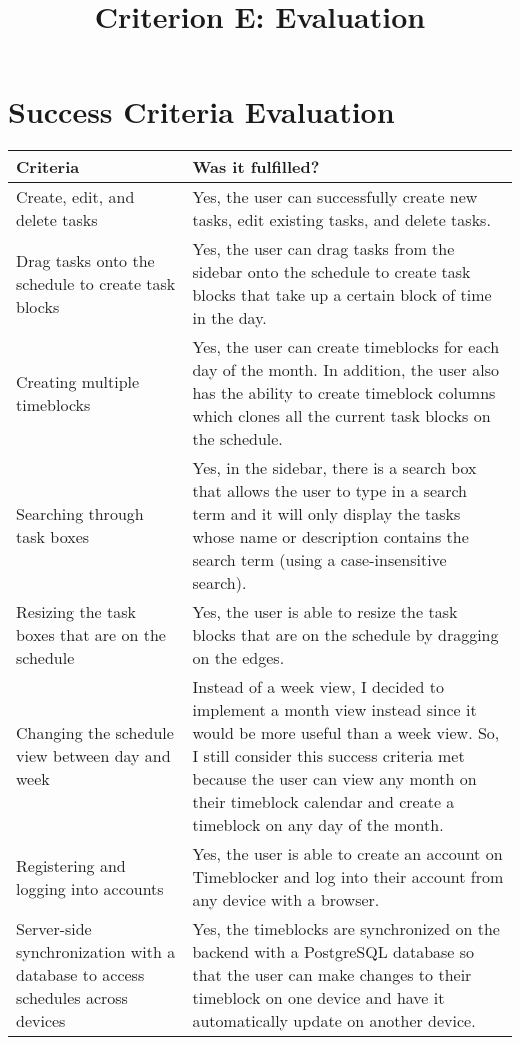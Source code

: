 \documentclass[12pt]{report}
\title{Criterion E: Evaluation}
\begin{document}
\centerline{\textcolor{msblue}{
		\textbf{\fontsize{13}{13}\MyTitle}
	}}


\section*{Success Criteria Evaluation}

\def\arraystretch{1.5}
\begin{xltabular}{\textwidth}{|X|X|}
	\hline
	\textbf{Criteria}
	&
	\textbf{Was it fulfilled?}
	\\\hline
	Create, edit, and delete tasks
	&
	Yes, the user can successfully create new tasks, edit existing tasks, and delete tasks.
	\\\hline
	Drag tasks onto the schedule to create task blocks
	&
	Yes, the user can drag tasks from the sidebar onto the schedule to create task blocks that take up a certain block of time in the day.
	\\\hline
	Creating multiple timeblocks
	&
	Yes, the user can create timeblocks for each day of the month. In addition, the user also has the ability to create timeblock columns which clones all the current task blocks on the schedule.
	\\\hline
	Searching through task boxes
	&
	Yes, in the sidebar, there is a search box that allows the user to type in a search term and it will only display the tasks whose name or description contains the search term (using a case-insensitive search).
	\\\hline
	Resizing the task boxes that are on the schedule
	&
	Yes, the user is able to resize the task blocks that are on the schedule by dragging on the edges.
	\\\hline
	Changing the schedule view between day and week
	&
	Instead of a week view, I decided to implement a month view instead since it would be more useful than a week view. So, I still consider this success criteria met because the user can view any month on their timeblock calendar and create a timeblock on any day of the month.
	\\\hline
	Registering and logging into accounts
	&
	Yes, the user is able to create an account on Timeblocker and log into their account from any device with a browser.
	\\\hline
	Server-side synchronization with a database to access schedules across devices
	&
	Yes, the timeblocks are synchronized on the backend with a PostgreSQL database so that the user can make changes to their timeblock on one device and have it automatically update on another device.

\end{xltabular}
\end{document}
